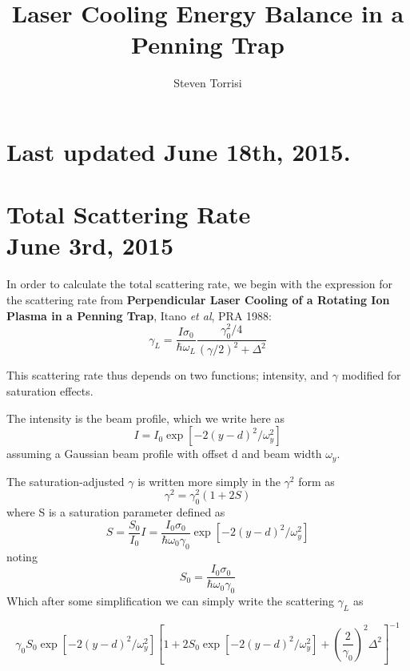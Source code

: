 \documentclass[11pt, oneside,reqno]{amsart}   	%
\title{ Laser Cooling Energy Balance in a Penning Trap}
\author{Steven Torrisi }
\newcommand{\eqn}[1]{\begin{equation}#1 \end{equation}}
\begin{document}
\maketitle
%
%
%
%
%
%
%
%
%
\section{Last updated June 18th, 2015.}
\section{Total Scattering Rate \\ June 3rd, 2015}


In order to calculate the total scattering rate, we begin with the expression for the scattering rate from \textbf{Perpendicular Laser Cooling of a Rotating Ion Plasma in a Penning Trap}, Itano \emph{et al}, PRA 1988:
\eqn{\gamma_L = \frac{I \sigma_0}{\hbar \omega_L} \frac{\gamma_0^2/4}{(\gamma/2)^2 + \Delta^2}}

This scattering rate thus depends on two functions; intensity, and $\gamma$ modified for saturation effects.

The intensity is the beam profile, which we write here as 
\eqn{ I= I_0 \exp[ -2(y-d)^2/\omega_y^2]}
assuming a Gaussian beam profile with offset d and beam width $\omega_y$.

The saturation-adjusted $\gamma$ is written more simply in the $\gamma^2$ form as  \eqn{ \gamma^2 = \gamma_0^2 (1+2S)}
where S is a saturation parameter defined as
\eqn{S= \frac{S_0}{I_0} I = \frac{I_0 \sigma_0}{\hbar \omega_0 \gamma_0}  \exp[ -2(y-d)^2/\omega_y^2]}
noting \eqn{S_0 =  \frac{I_0 \sigma_0}{\hbar \omega_0 \gamma_0} }
Which after some simplification we can simply write the scattering $\gamma_L$ as

\eqn{ \gamma_0 S_0 \exp [ -2 (y-d)^2/\omega_y^2] \left[ 1+2S_0 \exp [ -2 (y-d)^2/\omega_y^2] +\left( \frac{2}{\gamma_0} \right)^2 \Delta^2 \right]^{-1}}
\end{document}

